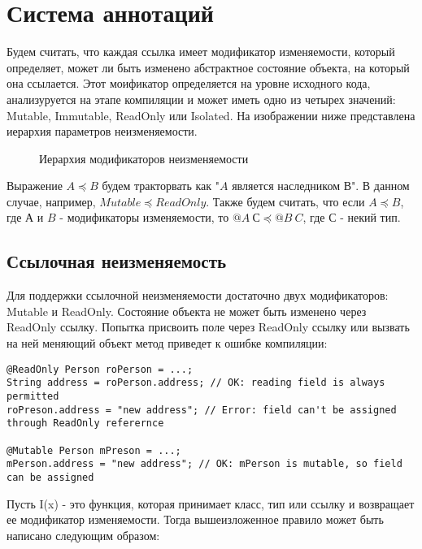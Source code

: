 \section{Система аннотаций}

Будем считать, что каждая ссылка имеет модификатор изменяемости, который определяет, может ли быть изменено абстрактное состояние объекта, на который она ссылается. Этот моификатор определяется на уровне исходного кода, анализуруется на этапе компиляции и может иметь одно из четырех значений: Mutable, Immutable, ReadOnly или Isolated. На изображении ниже представлена иерархия параметров неизменяемости. 

\begin{figure}[h]
\caption{Иерархия модификаторов неизменяемости}
\label{pic:my_classes}
\end{figure}

Выражение $A \preceq B$ будем тракторвать как "$A$ является наследником $В$". В данном случае, например, $Mutable \preceq ReadOnly$. Также будем считать, что если $A \preceq B$, где $А$ и $B$ - модификаторы изменяемости, то $@A\:С \preceq @B\:C$, где $С$ - некий тип.

\subsection{Ссылочная неизменяемость}

Для поддержки ссылочной неизменяемости достаточно двух модификаторов: Mutable и ReadOnly. Состояние объекта не может быть изменено через ReadOnly ссылку. Попытка присвоить поле через ReadOnly ссылку или вызвать на ней меняющий объект метод приведет к ошибке компиляции:

\begin{lstlisting}[caption=Mutable и RadOnly ссылки, label=code:mutable_vs_readonly]
@ReadOnly Person roPerson = ...;
String address = roPerson.address; // OK: reading field is always permitted
roPreson.address = "new address"; // Error: field can't be assigned through ReadOnly referernce

@Mutable Person mPreson = ...;
mPerson.address = "new address"; // OK: mPerson is mutable, so field can be assigned
\end{lstlisting} 

Пусть I(x) - это функция, которая принимает класс, тип или ссылку и возвращает ее модификатор изменяемости. Тогда вышеизложенное правило может быть написано следующим образом:

